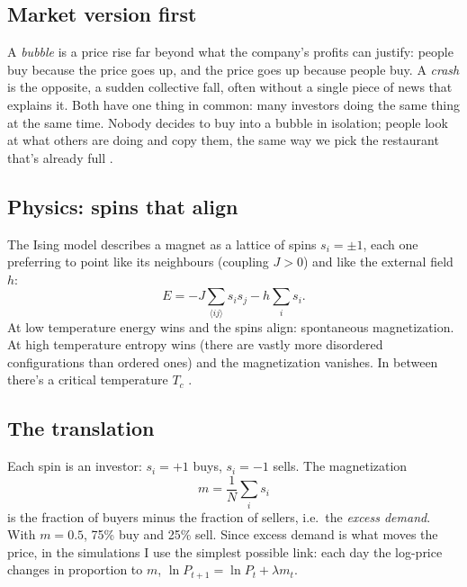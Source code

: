 \documentclass[11pt,a4paper]{article}
\begin{document}
\subsection{Market version first}

A \emph{bubble} is a price rise far beyond what the company's profits can justify: people buy because the
price goes up, and the price goes up because people buy. A \emph{crash} is the opposite, a sudden
collective fall, often without a single piece of news that explains it. Both have one thing in common:
many investors doing the same thing at the same time. Nobody decides to buy into a bubble in isolation;
people look at what others are doing and copy them, the same way we pick the restaurant that's already
full \cite{kirman1993}.

\subsection{Physics: spins that align}

The Ising model describes a magnet as a lattice of spins $s_i=\pm1$, each one preferring to point like its
neighbours (coupling $J>0$) and like the external field $h$:
\begin{equation}
E=-J\sum_{\langle ij\rangle}s_is_j-h\sum_is_i .
\end{equation}
At low temperature energy wins and the spins align: spontaneous magnetization. At high temperature entropy
wins (there are vastly more disordered configurations than ordered ones) and the magnetization vanishes.
In between there's a critical temperature $T_c$ \cite{uam_me3}.

\subsection{The translation}

Each spin is an investor: $s_i=+1$ buys, $s_i=-1$ sells. The magnetization
\begin{equation}
m=\frac1N\sum_is_i
\end{equation}
is the fraction of buyers minus the fraction of sellers, i.e.\ the \emph{excess demand}. With $m=0.5$, 75\%
buy and 25\% sell. Since excess demand is what moves the price, in the simulations I use the simplest
possible link: each day the log-price changes in proportion to $m$, $\ln P_{t+1}=\ln P_t+\lambda m_t$.
\end{document}
